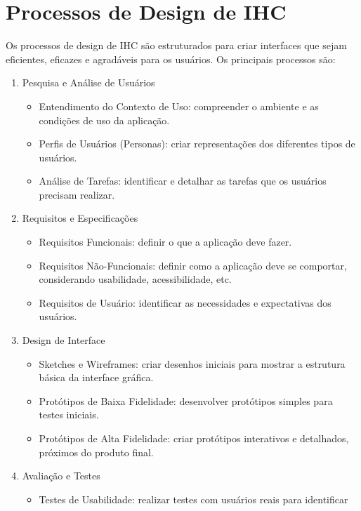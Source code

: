 \documentclass[
  12pt,
  openright,
  twoside,
  a4paper,
  english,
  french,
  spanish,
  brazil
]{abntex2}
\begin{document}
\section{Processos de Design de IHC}

Os processos de design de IHC são estruturados para criar interfaces que sejam
eficientes, eficazes e agradáveis para os usuários. Os principais processos são:

\begin{enumerate}
  \item Pesquisa e Análise de Usuários
  \begin{itemize}
    \item
      Entendimento do Contexto de Uso: compreender o ambiente e as condições de
      uso da aplicação.
    \item
      Perfis de Usuários (Personas): criar representações dos diferentes tipos
      de usuários.
    \item
      Análise de Tarefas: identificar e detalhar as tarefas que os usuários
      precisam realizar.
  \end{itemize}
  \item Requisitos e Especificações
  \begin{itemize}
    \item Requisitos Funcionais: definir o que a aplicação deve fazer.
    \item
      Requisitos Não-Funcionais: definir como a aplicação deve se comportar,
      considerando usabilidade, acessibilidade, etc.
    \item
      Requisitos de Usuário: identificar as necessidades e expectativas dos
      usuários.
  \end{itemize}
  \item Design de Interface
  \begin{itemize}
    \item
      Sketches e Wireframes: criar desenhos iniciais para mostrar a estrutura
      básica da interface gráfica.
    \item
      Protótipos de Baixa Fidelidade: desenvolver protótipos simples para testes
      iniciais.
    \item
      Protótipos de Alta Fidelidade: criar protótipos interativos e detalhados,
      próximos do produto final.
  \end{itemize}
  \item Avaliação e Testes
  \begin{itemize}
    \item
      Testes de Usabilidade: realizar testes com usuários reais para identificar

\end{itemize}
\end{enumerate}
\end{document}

